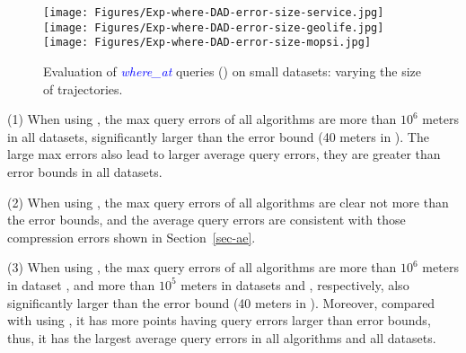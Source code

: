 {\begin{figure*}[tb!]
	\centering
	\texttt{[image: Figures/Exp-where-DAD-error-size-service.jpg]}	\hspace{0.5ex}
	\texttt{[image: Figures/Exp-where-DAD-error-size-geolife.jpg]}	\hspace{0.5ex}
	\texttt{[image: Figures/Exp-where-DAD-error-size-mopsi.jpg]}	
	\vspace{-2ex}
	\caption{\small Evaluation of \textcolor{blue}{\emph{where\_at}} queries (\dad) on small datasets: varying the size of trajectories.}
	\label{fig:query-dad-size}
	\vspace{-1ex}
\end{figure*}




\ni (1) When using \ped, the max query errors of all algorithms are more than $10^6$ meters in all datasets, significantly larger than the error bound (40 meters in ). The large max errors also lead to larger average query errors, \ie they are greater than error bounds in all datasets.


\ni (2) When using \sed, the max query errors of all algorithms are clear not more than the error bounds, and the average query errors are consistent with those compression errors shown in Section~\ref{sec-ae}.


\ni (3) When using \dad, the max query errors of all algorithms are more than $10^6$ meters in dataset \ucar, and more than $10^5$ meters in datasets \geolife and \mopsi, respectively, also significantly larger than the error bound (40 meters in ). Moreover, compared with using \ped, it has more points having query errors larger than error bounds, thus, it has the largest average query errors in all algorithms and all datasets.



}
